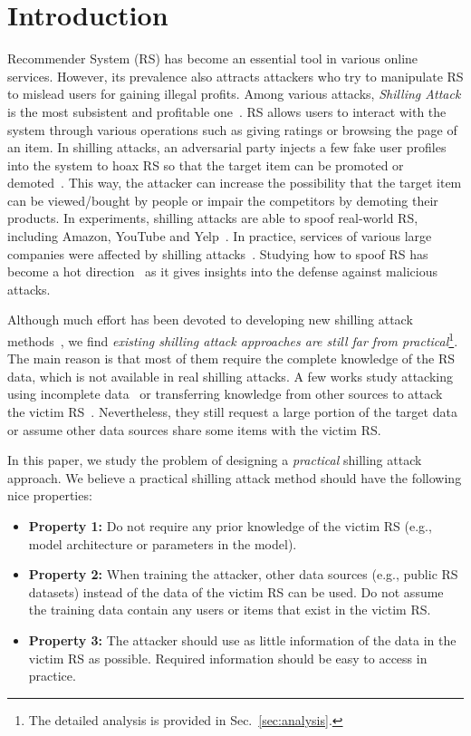 

\section{Introduction}
\label{sec:intro}


Recommender System (RS) has become an essential tool in various online services.
However, its prevalence also attracts attackers who try to manipulate RS to mislead users for gaining illegal profits.
Among various attacks, \emph{Shilling Attack} is the most subsistent and profitable one~\citep{abs-2206-11433}.
RS allows users to interact with the system through various operations such as giving ratings or browsing the page of an item.
In shilling attacks, an adversarial party injects a few fake user profiles into the system to hoax RS so that the target item can be promoted or demoted~\citep{GunesKBP14}.
This way, the attacker can increase the possibility that the target item can be viewed/bought by people or impair the competitors by demoting their products.
In experiments, shilling attacks are able to spoof real-world RS, including Amazon, YouTube and Yelp~\citep{XingMDSFL13,YangGC17}.
In practice, services of various large companies were affected by shilling attacks~\citep{LamR04}.
Studying how to spoof RS has become a hot direction~\cite{DeldjooNM21} as it gives insights into the defense against malicious attacks.


Although much effort has been devoted to developing new shilling attack methods~\cite{GunesKBP14,DeldjooNM21}, 
we find \emph{existing shilling attack approaches are still far from practical}\footnote{The detailed analysis is provided in Sec.~\ref{sec:analysis}.}.
The main reason is that most of them require the complete knowledge of the RS data, which is not available in  real shilling attacks.
A few works study attacking using incomplete data~\citep{ZhangTLSYZG21} or transferring knowledge from other sources to attack the victim RS~\citep{FanDZ0LWT021}.
Nevertheless, they still request a large portion of the target data or assume other data sources share some items with the victim RS.

In this paper, we study the problem of designing a \emph{practical} shilling attack approach.
We believe a practical shilling attack method should have the following nice properties:
\begin{itemize}
\item \textbf{Property 1:} Do not require any prior knowledge of the victim RS (e.g., model architecture or parameters in the model).


\item \textbf{Property 2:} When training the attacker, other data sources (e.g., public RS datasets) instead of the data of the victim RS can be used. Do not assume the training data contain any users or items that exist in the victim RS.


\item \textbf{Property 3:} The attacker should use as little information of the data in the victim RS as possible. Required information should be easy to access in practice.
\end{itemize}

